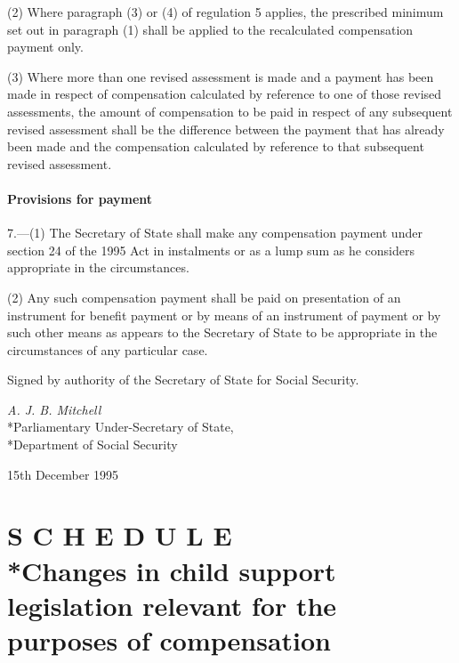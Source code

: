 \documentclass[12pt,a4paper]{article}
\begin{document}
(2) Where paragraph (3) or (4) of regulation 5 applies, the prescribed minimum set out in paragraph (1) shall be applied to the recalculated compensation payment only.

(3) Where more than one revised assessment is made and a payment has been made in respect of compensation calculated by reference to one of those revised assessments, the amount of compensation to be paid in respect of any subsequent revised assessment shall be the difference between the payment that has already been made and the compensation calculated by reference to that subsequent revised assessment.

\subsection[7. Provisions for payment]{Provisions for payment}

7.—(1) The Secretary of State shall make any compensation payment under section 24 of the 1995 Act in instalments or as a lump sum as he considers appropriate in the circumstances.

(2) Any such compensation payment shall be paid on presentation of an instrument for benefit payment or by means of an instrument of payment or by such other means as appears to the Secretary of State to be appropriate in the circumstances of any particular case.

\bigskip

Signed by authority of the Secretary of State for Social Security.

{\raggedleft
\emph{A. J. B. Mitchell}\\*Parliamentary Under-Secretary of State,\\*Department of Social Security

}

15th December 1995

\clearpage

\part[Schedule --- Changes in child support legislation relevant for the purposes of compensation]{S C H E D U L E\\*Changes in child support legislation relevant for the purposes of compensation}

\renewcommand\parthead{--- Schedule}
\end{document}
